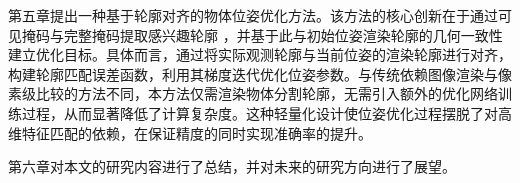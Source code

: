 \par 第五章提出一种基于轮廓对齐的物体位姿优化方法。该方法的核心创新在于通过可见掩码与完整掩码提取感兴趣轮廓 ，并基于此与初始位姿渲染轮廓的几何一致性建立优化目标。具体而言，通过将实际观测轮廓与当前位姿的渲染轮廓进行对齐，构建轮廓匹配误差函数，利用其梯度迭代优化位姿参数。与传统依赖图像渲染与像素级比较的方法不同，本方法仅需渲染物体分割轮廓，无需引入额外的优化网络训练过程，从而显著降低了计算复杂度。这种轻量化设计使位姿优化过程摆脱了对高维特征匹配的依赖，在保证精度的同时实现准确率的提升。

\par 第六章对本文的研究内容进行了总结，并对未来的研究方向进行了展望。





